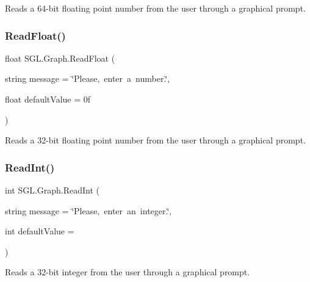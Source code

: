 Reads a 64-\/bit floating point number from the user through a graphical prompt. 

\mbox{\label{class_s_g_l_1_1_graph_aa9d57659823175542533c9cceeeb1ff6}} 
\subsubsection{\texorpdfstring{Read\+Float()}{ReadFloat()}}
{\footnotesize\ttfamily float S\+G\+L.\+Graph.\+Read\+Float (\begin{DoxyParamCaption}\item[{string}]{message = {\ttfamily \char`\"{}Please,~enter~a~number.\char`\"{}},  }\item[{float}]{default\+Value = {\ttfamily 0f} }\end{DoxyParamCaption})\hspace{0.3cm}{\ttfamily [inline]}}



Reads a 32-\/bit floating point number from the user through a graphical prompt. 

\mbox{\label{class_s_g_l_1_1_graph_a4162119a26ba960884e3660c0750d14c}} 
\subsubsection{\texorpdfstring{Read\+Int()}{ReadInt()}}
{\footnotesize\ttfamily int S\+G\+L.\+Graph.\+Read\+Int (\begin{DoxyParamCaption}\item[{string}]{message = {\ttfamily \char`\"{}Please,~enter~an~integer.\char`\"{}},  }\item[{int}]{default\+Value = {} }\end{DoxyParamCaption})\hspace{0.3cm}{\ttfamily [inline]}}



Reads a 32-\/bit integer from the user through a graphical prompt. 

\mbox{\label{class_s_g_l_1_1_graph_aa55701744ab9d06019ff60e4d2da0a16}} 
